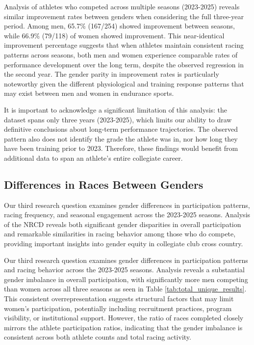 \documentclass[suppldata]{interact}
\theoremstyle{plain}%
\theoremstyle{definition}
\theoremstyle{remark}
\begin{document}
Analysis of athletes who competed across multiple seasons (2023-2025) reveals similar improvement rates between genders when considering the full three-year period. Among men, 65.7\% (167/254) showed improvement between seasons, while 66.9\% (79/118) of women showed improvement. This near-identical improvement percentage suggests that when athletes maintain consistent racing patterns across seasons, both men and women experience comparable rates of performance development over the long term, despite the observed regression in the second year. The gender parity in improvement rates is particularly noteworthy given the different physiological and training response patterns that may exist between men and women in endurance sports.


It is important to acknowledge a significant limitation of this analysis: the dataset spans only three years (2023-2025), which limits our ability to draw definitive conclusions about long-term performance trajectories. The observed pattern also does not identify the grade the athlete was in, nor how long they have been training prior to 2023. Therefore, these findings would benefit from additional data to span an athlete's entire collegiate career.


\subsection{Differences in Races Between Genders}

Our third research question examines gender differences in participation patterns, racing frequency, and seasonal engagement across the 2023-2025 seasons. Analysis of the NRCD reveals both significant gender disparities in overall participation and remarkable similarities in racing behavior among those who do compete, providing important insights into gender equity in collegiate club cross country.

Our third research question examines gender differences in participation patterns and racing behavior across the 2023-2025 seasons. Analysis reveals a substantial gender imbalance in overall participation, with significantly more men competing than women across all three seasons as seen in Table \ref{tab:total_unique_results}. This consistent overrepresentation suggests structural factors that may limit women's participation, potentially including recruitment practices, program visibility, or institutional support. However, the ratio of races completed closely mirrors the athlete participation ratios, indicating that the gender imbalance is consistent across both athlete counts and total racing activity.
\end{document}
